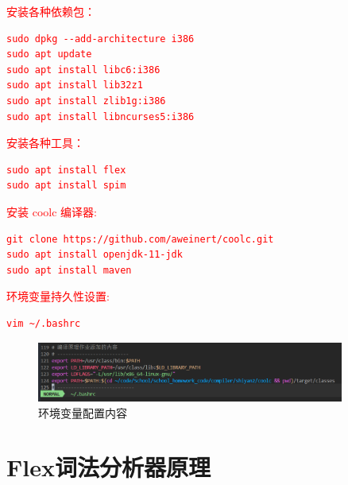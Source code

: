 \documentclass[twocolumn]{article}
\begin{document}
\textcolor{red}{
安装各种依赖包：
\begin{verbatim}
sudo dpkg --add-architecture i386 
sudo apt update 
sudo apt install libc6:i386 
sudo apt install lib32z1 
sudo apt install zlib1g:i386 
sudo apt install libncurses5:i386
\end{verbatim}

安装各种工具：
\begin{verbatim}
sudo apt install flex
sudo apt install spim
\end{verbatim}

安装 coolc 编译器:
\begin{verbatim}
git clone https://github.com/aweinert/coolc.git
sudo apt install openjdk-11-jdk
sudo apt install maven
\end{verbatim}

环境变量持久性设置:
\begin{verbatim}
vim ~/.bashrc
\end{verbatim}
}
\begin{figure}[htbp]
    \centering
    \includegraphics[width=0.9\textwidth]{env.png}
    \caption{环境变量配置内容}
    \label{fig:env_config}
\end{figure}

\section{Flex词法分析器原理}
\end{document}
